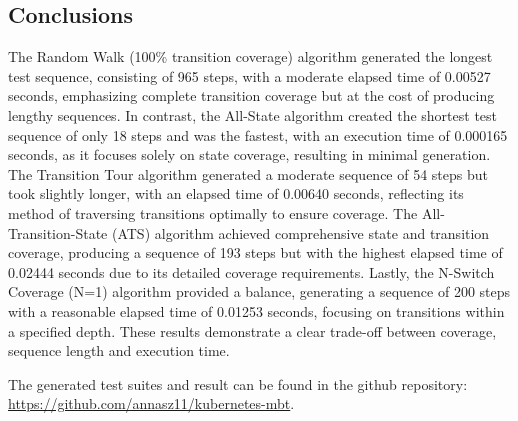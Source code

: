 \documentclass[main.tex]{subfiles}
\begin{document}
\subsection{Conclusions}
The Random Walk (100\% transition coverage) algorithm generated the longest test sequence, consisting of 965 steps, with a moderate elapsed time of 0.00527 seconds, emphasizing complete transition coverage but at the cost of producing lengthy sequences. In contrast, the All-State algorithm created the shortest test sequence of only 18 steps and was the fastest, with an execution time of 0.000165 seconds, as it focuses solely on state coverage, resulting in minimal generation. The Transition Tour algorithm generated a moderate sequence of 54 steps but took slightly longer, with an elapsed time of 0.00640 seconds, reflecting its method of traversing transitions optimally to ensure coverage. The All-Transition-State (ATS) algorithm achieved comprehensive state and transition coverage, producing a sequence of 193 steps but with the highest elapsed time of 0.02444 seconds due to its detailed coverage requirements. Lastly, the N-Switch Coverage (N=1) algorithm provided a balance, generating a sequence of 200 steps with a reasonable elapsed time of 0.01253 seconds, focusing on transitions within a specified depth. These results demonstrate a clear trade-off between coverage, sequence length and execution time.


The generated test suites and result can be found in the github repository: \url{https://github.com/annasz11/kubernetes-mbt}.
\end{document}
